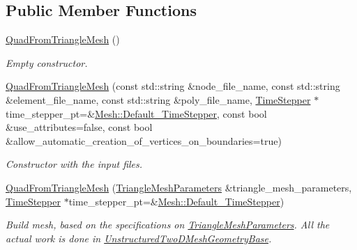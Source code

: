 \subsection*{Public Member Functions}
\begin{DoxyCompactItemize}
\item 
\hyperlink{classoomph_1_1QuadFromTriangleMesh_af94e552be1bd35ec03eed1bcfcbc40af}{Quad\+From\+Triangle\+Mesh} ()
\begin{DoxyCompactList}\small\item\em Empty constructor. \end{DoxyCompactList}\item 
\hyperlink{classoomph_1_1QuadFromTriangleMesh_ab6fd5b49a1c1a4b29fc000953b732b98}{Quad\+From\+Triangle\+Mesh} (const std\+::string \&node\+\_\+file\+\_\+name, const std\+::string \&element\+\_\+file\+\_\+name, const std\+::string \&poly\+\_\+file\+\_\+name, \hyperlink{classoomph_1_1TimeStepper}{Time\+Stepper} $\ast$time\+\_\+stepper\+\_\+pt=\&\hyperlink{classoomph_1_1Mesh_a12243d0fee2b1fcee729ee5a4777ea10}{Mesh\+::\+Default\+\_\+\+Time\+Stepper}, const bool \&use\+\_\+attributes=false, const bool \&allow\+\_\+automatic\+\_\+creation\+\_\+of\+\_\+vertices\+\_\+on\+\_\+boundaries=true)
\begin{DoxyCompactList}\small\item\em Constructor with the input files. \end{DoxyCompactList}\item 
\hyperlink{classoomph_1_1QuadFromTriangleMesh_a78f9c12882d4554e4484255640b6bf51}{Quad\+From\+Triangle\+Mesh} (\hyperlink{classoomph_1_1TriangleMeshParameters}{Triangle\+Mesh\+Parameters} \&triangle\+\_\+mesh\+\_\+parameters, \hyperlink{classoomph_1_1TimeStepper}{Time\+Stepper} $\ast$time\+\_\+stepper\+\_\+pt=\&\hyperlink{classoomph_1_1Mesh_a12243d0fee2b1fcee729ee5a4777ea10}{Mesh\+::\+Default\+\_\+\+Time\+Stepper})
\begin{DoxyCompactList}\small\item\em Build mesh, based on the specifications on \hyperlink{classoomph_1_1TriangleMeshParameters}{Triangle\+Mesh\+Parameters}. All the actual work is done in \hyperlink{classoomph_1_1UnstructuredTwoDMeshGeometryBase}{Unstructured\+Two\+D\+Mesh\+Geometry\+Base}. \end{DoxyCompactList}\item 

\end{DoxyCompactItemize}
